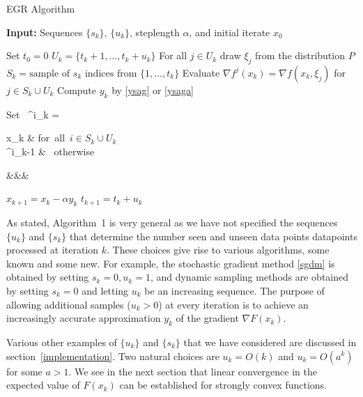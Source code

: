\documentclass[11pt]{article}
\begin{document}
\bigskip
\begin{algorithm}
	[H] 
	\caption{EGR Algorithm}
	\label{alg1}
	{\bf Input:} Sequences $\{ s_k\}$, $\{ u_k \}$, steplength $ \alpha $, and initial iterate $x_0$
	\begin{algorithmic}
		[1] 
		\State Set $t_{0} = 0$
		\State $U_k =\{t_{k}+1,\ldots, t_{k}+u_k \}$ 
		\State For  all $j \in U_k$ draw $\xi_j$ from the distribution $P$ 
		\State $S_k = \mbox{sample of } s_k \mbox{ indices from }\{ 1, \ldots ,t_{k}\}$ 
           \State Evaluate $\nabla f^j(x_k) = \nabla f(x_k, \xi_j) $ for $j \in S_k \cup U_k$
           \State Compute $y_k$ by \eqref{ysag} or \eqref{ysaga}
		\State \begin{flalign}  \label{chico} \mbox{Set   }  \phi^i_k =
		\begin{cases} 
  x_k & \mbox{for all $i \in S_k\cup U_k$ } \\
  \phi^i_{k-1} & \mbox{ otherwise} 
 \end{cases}&&&
\end{flalign}
		\State $x_{k+1} = x_k - \alpha y_k$ 
		\State $t_{k+1} = t_{k} +u_k$ 
		\EndLoop 
	\end{algorithmic}
\end{algorithm}


As stated, Algorithm~1 is very general as we have not specified the sequences $\{ u_k \}$ and $\{ s_k \}$ that determine the number seen and unseen data points datapoints processed at iteration $k$. These choices give rise to various algorithms, some known and some new. For example,  the stochastic gradient method \eqref{sgdm} is obtained by setting $s_k=0, u_k =1$, and dynamic sampling methods are obtained by setting $s_k=0$ and letting $u_k$ be an increasing sequence. The purpose of allowing additional samples ($u_k >0$) at every iteration is to achieve an increasingly accurate approximation $y_k$ of the gradient $\nabla F(x_k)$. 

Various other examples of $\{ u_k \}$ and $\{ s_k \}$ that we have considered are discussed in section~\ref{implementation}. Two natural choices are $u_k = O(k)$ and $u_k = O(a^k)$ for some $a>1$. We see in the next section that linear convergence in the expected value of $F(x_k)$ can be established for strongly convex functions. 
\end{document}
